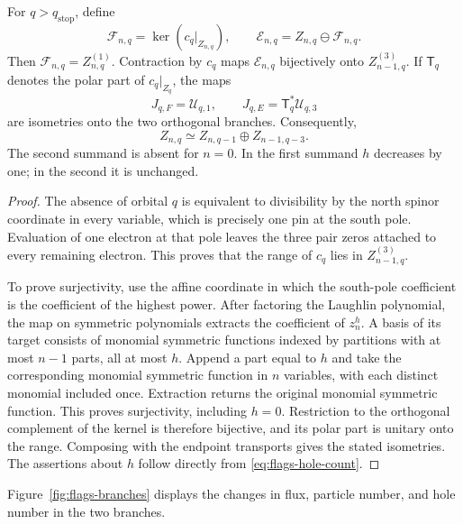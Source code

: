 \begin{lemma}
\label{lem:flags-branch-algebra}
For $q>q_{\mathrm{stop}}$, define
\[
 \mathcal F_{n,q}=\ker(c_q|_{Z_{n,q}}),\qquad
 \mathcal E_{n,q}=Z_{n,q}\ominus\mathcal F_{n,q}.
\]
Then $\mathcal F_{n,q}=Z_{n,q}^{(1)}$.  Contraction by $c_q$ maps
$\mathcal E_{n,q}$ bijectively onto $Z_{n-1,q}^{(3)}$.  If $\mathsf T_q$ denotes
the polar part of $c_q|_{Z_q}$, the maps
\[
 J_{q,F}=\mathcal U_{q,1},\qquad
 J_{q,E}=\mathsf T_q^*\mathcal U_{q,3}
\]
are isometries onto the two orthogonal branches.  Consequently,
\begin{equation}
 Z_{n,q}\simeq Z_{n,q-1}\oplus Z_{n-1,q-3}.
 \label{eq:flags-two-branches}
\end{equation}
The second summand is absent for $n=0$.  In the first summand $h$ decreases
by one; in the second it is unchanged.
\end{lemma}

\begin{proof}
The absence of orbital $q$ is equivalent to divisibility by the north
spinor coordinate in every variable, which is precisely one pin at the
south pole.  Evaluation of one electron at that pole leaves the three
pair zeros attached to every remaining electron.  This proves that the
range of $c_q$ lies in $Z_{n-1,q}^{(3)}$.

To prove surjectivity, use the affine coordinate in which the south-pole
coefficient is the coefficient of the highest power.  After factoring
the Laughlin polynomial, the map on symmetric polynomials extracts the
coefficient of $z_n^h$.  A basis of its target consists of monomial
symmetric functions indexed by partitions with at most $n-1$ parts, all
at most $h$.  Append a part equal to $h$ and take the corresponding
monomial symmetric function in $n$ variables, with each distinct monomial
included once.  Extraction returns the original monomial symmetric function.
This proves surjectivity, including $h=0$.  Restriction to the orthogonal
complement of the kernel is therefore bijective, and its polar part is
unitary onto the range.  Composing with the endpoint transports gives
the stated isometries.  The assertions about $h$ follow directly from
\eqref{eq:flags-hole-count}.
\end{proof}

Figure~\ref{fig:flags-branches} displays the changes in flux, particle
number, and hole number in the two branches.

